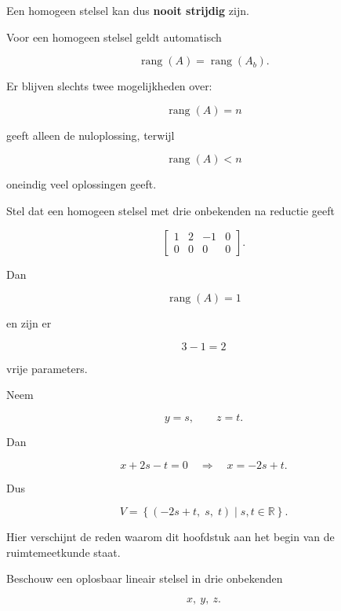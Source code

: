 \documentclass{ximera}
\begin{document}
\begin{opmerking}
Een homogeen stelsel kan dus \textbf{nooit strijdig} zijn.

Voor een homogeen stelsel geldt automatisch

\[
\operatorname{rang}(A)
=
\operatorname{rang}(A_b).
\]

Er blijven slechts twee mogelijkheden over:

\[
\operatorname{rang}(A)=n
\]

geeft alleen de nuloplossing, terwijl

\[
\operatorname{rang}(A)<n
\]

oneindig veel oplossingen geeft.
\end{opmerking}


\begin{voorbeeld}

Stel dat een homogeen stelsel met drie onbekenden na reductie geeft

\[
\left[
\begin{array}{ccc|c}
1&2&-1&0\\
0&0&0&0
\end{array}
\right].
\]

Dan

\[
\operatorname{rang}(A)=1
\]

en zijn er

\[
3-1=2
\]

vrije parameters.

Neem

\[
y=s,\qquad z=t.
\]

Dan

\[
x+2s-t=0
\quad\Longrightarrow\quad
x=-2s+t.
\]

Dus

\[
V=
\left\{
(-2s+t,\;s,\;t)
\mid s,t\in\mathbb{R}
\right\}.
\]

\end{voorbeeld}





Hier verschijnt de reden waarom dit hoofdstuk aan het begin van de
ruimtemeetkunde staat.

Beschouw een oplosbaar lineair stelsel in drie onbekenden

\[
x,\ y,\ z.
\]
\end{document}
